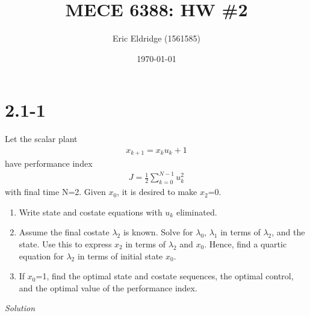 \documentclass{article}
\title{MECE 6388: HW \#2}
\date{\today}
\author{Eric Eldridge (1561585)}
\begin{document}
 \maketitle

  \section{2.1-1}

  Let the scalar plant 
  \begin{align*}
    x_{k+1}=x_ku_k+1
  \end{align*}
  have performance index 
  \begin{align*}
    J=\frac{1}{2}\sum_{k=0}^{N-1}u_k^2
  \end{align*}
  with final time N=2. Given $x_0$, it is desired to make $x_2$=0.
  \begin{enumerate}[label=(\alph*)]
    \item Write state and costate equations with $u_k$ eliminated.
    \item  Assume the final costate $\lambda_2$ is known. Solve for $\lambda_0$, $\lambda_1$ in terms of $\lambda_2$, and the state. 
	   Use this to express $x_2$ in terms of $\lambda_2$ and $x_0$. Hence, find a quartic equation for $\lambda_2$ in terms of initial state $x_0$. 
    \item If $x_0$=1, find the optimal state and costate sequences, the optimal control, and the optimal value of the performance index.
  \end{enumerate}


  \noindent \textit{Solution} \newline \newline
  
\end{document}
